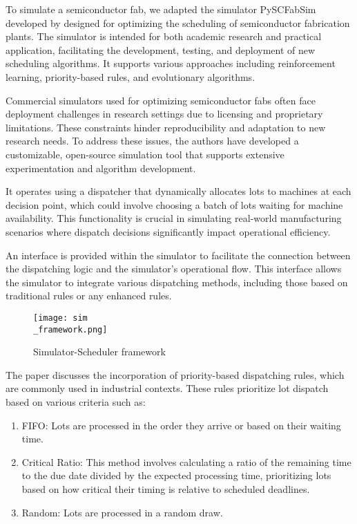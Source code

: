 To simulate a semiconductor fab, we adapted the simulator PySCFabSim developed by \cite{Kovacs2022} designed for optimizing the scheduling of semiconductor fabrication plants. The simulator is intended for both academic research and practical application, facilitating the development, testing, and deployment of new scheduling algorithms. It supports various approaches including reinforcement learning, priority-based rules, and evolutionary algorithms.

Commercial simulators used for optimizing semiconductor fabs often face deployment challenges in research settings due to licensing and proprietary limitations. These constraints hinder reproducibility and adaptation to new research needs. To address these issues, the authors have developed a customizable, open-source simulation tool that supports extensive experimentation and algorithm development.

It operates using a dispatcher that dynamically allocates lots to machines at each decision point, which could involve choosing a batch of lots waiting for machine availability. This functionality is crucial in simulating real-world manufacturing scenarios where dispatch decisions significantly impact operational efficiency.

An interface is provided within the simulator to facilitate the connection between the dispatching logic and the simulator's operational flow. This interface allows the simulator to integrate various dispatching methods, including those based on traditional rules or any enhanced rules.

\begin{figure}[t]
	\texttt{[image: sim\\\_framework.png]}
	\caption{Simulator-Scheduler framework}
	\label{fig:ss}
\end{figure}

The paper discusses the incorporation of priority-based dispatching rules, which are commonly used in industrial contexts. These rules prioritize lot dispatch based on various criteria such as:

\begin{enumerate}
	\item FIFO: Lots are processed in the order they arrive or based on their waiting time.
	\item Critical Ratio: This method involves calculating a ratio of the remaining time to the due date divided by the expected processing time, prioritizing lots based on how critical their timing is relative to scheduled deadlines.
	\item Random: Lots are processed in a random draw. 
\end{enumerate}


